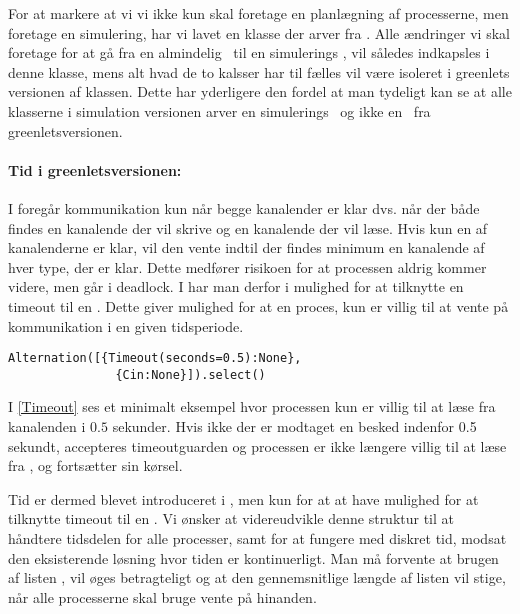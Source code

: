 
For at markere at vi vi ikke kun skal foretage en planlægning af processerne, men foretage en simulering, har vi lavet en  klasse der arver fra . Alle ændringer vi skal foretage for at gå fra en almindelig \sched ~til en simulerings \sched, vil således indkapsles i denne klasse, mens alt hvad de to kalsser har til fælles vil være isoleret i greenlets versionen af \sched klassen. Dette har yderligere den fordel at man tydeligt kan se at alle klasserne i simulation versionen arver en simulerings \sched ~og ikke en \sched ~fra greenletsversionen. 


\paragraph*{Tid i greenletsversionen:}
I \pycsp foregår kommunikation kun når begge kanalender er klar dvs.
når der både findes en kanalende der vil skrive og en kanalende der vil læse. 
Hvis kun en af kanalenderne er klar, vil den vente indtil
der findes minimum en kanalende af hver type, der er klar. Dette medfører risikoen for at processen aldrig kommer videre, men går i deadlock. I \pycsp har man derfor i  mulighed for at tilknytte en timeout til en . Dette
giver mulighed for at en proces, kun er villig til at vente på kommunikation 
i en given tidsperiode. 
\begin{lstlisting}[float=hbtp, label=Timeout,
  caption=Timeout i Alternation (fra dokumentationen til PyCSP)]
  Alternation([{Timeout(seconds=0.5):None},
               {Cin:None}]).select()
\end{lstlisting} 

I \cref{Timeout} ses et minimalt eksempel hvor processen kun er villig til at læse fra kanalenden  i $0.5$ sekunder. Hvis ikke der er modtaget en besked indenfor 0.5 sekundt, accepteres timeoutguarden og processen er ikke længere villig til at læse fra , og fortsætter sin kørsel.

Tid er dermed blevet introduceret i \pycsp, men kun for at at have mulighed for at tilknytte timeout til en . Vi ønsker at videreudvikle denne struktur til at håndtere tidsdelen for alle processer, samt for at fungere med diskret tid, modsat den eksisterende løsning hvor tiden er kontinuerligt. Man må forvente at brugen af listen , vil øges betragteligt og at den gennemsnitlige længde af listen vil stige, når alle processerne skal bruge vente på hinanden.


